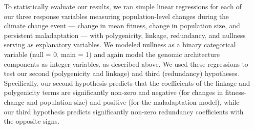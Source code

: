 \documentclass[9pt,twocolumn,twoside,lineno]{pnas-new}
\begin{document}
{To statistically evaluate our results,
we ran simple linear regressions
for each of our three response variables measuring
population-level changes during the climate change event --- change in mean fitness, change in population size,
and persistent maladaptation --- with polygenicity,
linkage, redundancy, and nullness serving as explanatory variables.
We modeled nullness as a binary categorical variable (null = 0, main = 1)
and again model the genomic architecture components
as integer variables, as described above.
We used these regressions to test our second 
(polygenicity and linkage) and third (redundancy) hypotheses.
Specifically, our second hypothesis predicts that
the coefficients of the linkage and polygenicity terms are significantly
non-zero and negative (for changes in fitness-change
and population size) and positive (for the maladaptation
model),
while our third hypothesis predicts significantly non-zero
redundancy coefficients with the opposite signs.

} %




\showmatmethods{} %


\showacknow{} %


\end{document}
